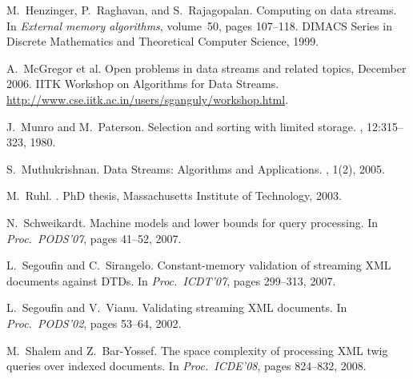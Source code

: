 \documentclass[proceedings]{stacs}
\theoremstyle{plain}\newtheorem{satz}[thm]{Satz}
\theoremstyle{definition}\newtheorem{crucial}[thm]{Crucial Definition}
\begin{document}
\begin{thebibliography}{10}
M.~Henzinger, P.~Raghavan, and S.~Rajagopalan.
\newblock Computing on data streams.
\newblock In {\em External memory algorithms}, volume~50, pages 107--118.
  DIMACS Series in Discrete Mathematics and Theoretical Computer Science, 1999.

A.~{McGregor et al.}
\newblock Open problems in data streams and related topics, December 2006.
\newblock IITK Workshop on Algorithms for Data Streams. 
  \url{http://www.cse.iitk.ac.in/users/sganguly/workshop.html}.

J.~Munro and M.~Paterson.
\newblock Selection and sorting with limited storage.
, 12:315--323, 1980.

S.~Muthukrishnan.
\newblock Data {S}treams: {A}lgorithms and {A}pplications.
, 1(2),
  2005.

M.~Ruhl.
.
\newblock PhD thesis, Massachusetts Institute of Technology, 2003.

N.~Schweikardt.
\newblock Machine models and lower bounds for query processing.
\newblock In {\em Proc.\ PODS'07}, pages 41--52, 2007.

L.~Segoufin and C.~Sirangelo.
\newblock Constant-memory validation of streaming {XML} documents against
  {DTDs}.
\newblock In {\em Proc.\ ICDT'07}, pages 299--313, 2007.

L.~Segoufin and V.~Vianu.
\newblock Validating streaming {XML} documents.
\newblock In {\em Proc.\ PODS'02}, pages 53--64, 2002.

M.~Shalem and Z.~Bar-Yossef.
\newblock The space complexity of processing {XML} twig queries over indexed
  documents.
\newblock In {\em Proc.\ ICDE'08}, pages 824--832, 2008.

\newpage
\phantom{.}
\end{thebibliography}
\end{document}
